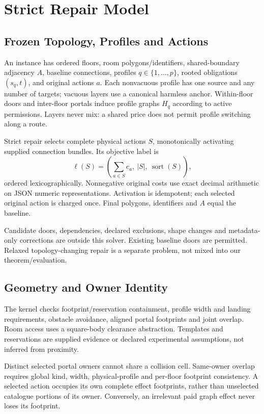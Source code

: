 \documentclass[conference]{IEEEtran}
\begin{document}
\section{Strict Repair Model}
\subsection{Frozen Topology, Profiles and Actions}
An instance has ordered floors, room polygons/identifiers, shared-boundary adjacency $A$, baseline connections, profiles $q\in\{1,\ldots,p\}$, rooted obligations $(s_q,t)$, and original actions $a$. Each nonvacuous profile has one source and any number of targets; vacuous layers use a canonical harmless anchor. Within-floor doors and inter-floor portals induce profile graphs $H_q$ according to active permissions. Layers never mix: a shared price does not permit profile switching along a route.

Strict repair selects complete physical actions $S$, monotonically activating supplied connection bundles. Its objective label is
\begin{equation}
\ell(S)=\left(\sum_{a\in S}c_a,\ |S|,\ \operatorname{sort}(S)\right),
\label{eq:objective}
\end{equation}
ordered lexicographically. Nonnegative original costs use exact decimal arithmetic on JSON numeric representations. Activation is idempotent; each selected original action is charged once. Final polygons, identifiers and $A$ equal the baseline.

Candidate doors, dependencies, declared exclusions, shape changes and metadata-only corrections are outside this solver. Existing baseline doors are permitted. Relaxed topology-changing repair is a separate problem, not mixed into our theorem/evaluation.

\subsection{Geometry and Owner Identity}
The kernel checks footprint/reservation containment, profile width and landing requirements, obstacle avoidance, aligned portal footprints and joint overlap. Room access uses a square-body clearance abstraction. Templates and reservations are supplied evidence or declared experimental assumptions, not inferred from proximity.

Distinct selected portal owners cannot share a collision cell. Same-owner overlap requires global kind, width, physical-profile and per-floor footprint consistency. A selected action occupies its own complete effect footprints, rather than unselected catalogue portions of its owner. Conversely, an irrelevant paid graph effect never loses its footprint.
\end{document}
